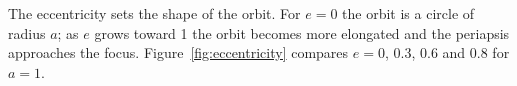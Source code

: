 The eccentricity sets the shape of the orbit.
For $e = 0$ the orbit is a circle of radius $a$; as $e$ grows toward 1
the orbit becomes more elongated and the periapsis approaches the focus.
Figure~\ref{fig:eccentricity} compares $e = 0$, $0.3$, $0.6$ and $0.8$ for $a = 1$.


